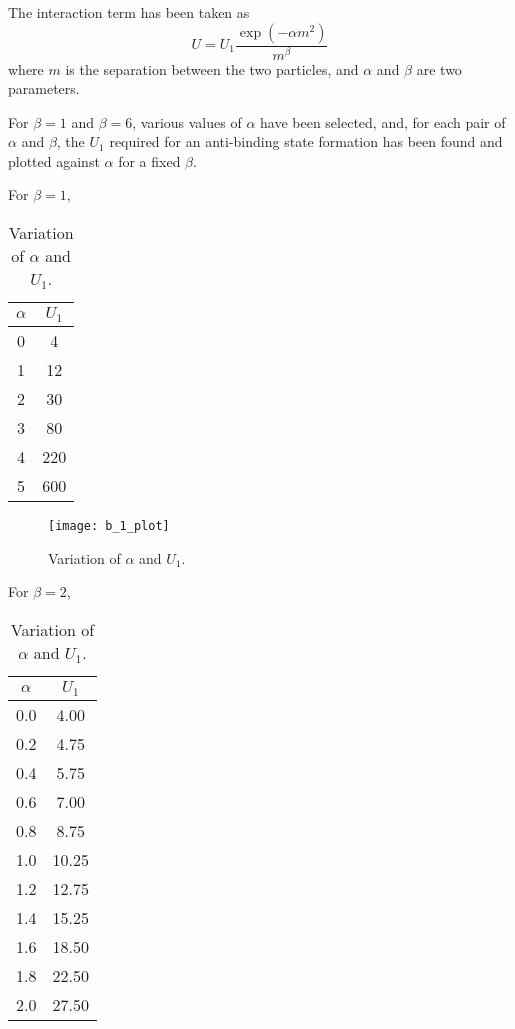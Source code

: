 \documentclass[twoclumn, a4, 11pt]{article}
\begin{document}

The interaction term has been taken as
\begin{equation}
U = U_1 \frac{\exp(- \alpha m ^ 2)}{m ^ \beta}
\end{equation}
where $m$ is the separation between the two particles, and $\alpha$ and $\beta$ are two parameters.

For $\beta=1$ and $\beta = 6$, various values of $\alpha$ have been selected, and, for each pair of $\alpha$ and $\beta$, the $U_1$ required for an anti-binding state formation has been found and plotted against $\alpha$ for a fixed $\beta$.

For $\beta = 1$,
\begin{table}[h!]
\centering
\begin{tabular}{c|c}
\hline\hline
$\alpha$	&	$U_1$	\\
\hline
0	&	4	\\
1	&	12	\\
2	&	30	\\
3	&	80	\\
4	&	220	\\
5	&	600	\\
\hline
\end{tabular}
\caption{Variation of $\alpha$ and $U_1$.}
\end{table}

\begin{figure}[h!]
\centering
\texttt{[image: b\_1\_plot]}
\caption{Variation of $\alpha$ and $U_1$.}
\label{fig:b1plot}
\end{figure}

\pagebreak
For $\beta = 2$,
\begin{table}[h!]
\centering
\begin{tabular}{c|c}
\hline\hline
$\alpha$	&	$U_1$	\\
\hline
0.0	&	4.00	\\
0.2	&	4.75	\\
0.4	&	5.75	\\
0.6	&	7.00	\\
0.8	&	8.75	\\
1.0	&	10.25	\\
1.2	&	12.75	\\
1.4	&	15.25	\\
1.6	&	18.50	\\
1.8	&	22.50	\\
2.0	&	27.50	\\
\hline
\end{tabular}
\caption{Variation of $\alpha$ and $U_1$.}
\end{table}
\end{document}
